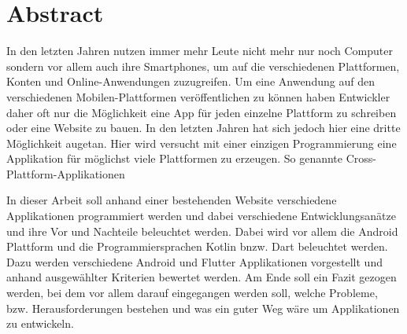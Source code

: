 \chapter*{Abstract}

\bigskip 

In den letzten Jahren nutzen immer mehr Leute nicht mehr nur noch Computer sondern vor allem auch ihre Smartphones, um auf die verschiedenen Plattformen, Konten und Online-Anwendungen zuzugreifen. Um eine Anwendung auf den verschiedenen Mobilen-Plattformen veröffentlichen zu können haben Entwickler daher oft nur die Möglichkeit eine App für jeden einzelne Plattform zu schreiben oder eine Website zu bauen. In den letzten Jahren hat sich jedoch hier eine dritte Möglichkeit augetan. Hier wird versucht mit einer einzigen Programmierung eine Applikation für möglichst viele Plattformen zu erzeugen. So genannte Cross-Plattform-Applikationen

In dieser Arbeit soll anhand einer bestehenden Website verschiedene Applikationen programmiert werden und dabei verschiedene Entwicklungsanätze und ihre Vor und Nachteile beleuchtet werden. Dabei wird vor allem die Android Plattform und die Programmiersprachen Kotlin bnzw. Dart beleuchtet werden. Dazu werden verschiedene Android und Flutter Applikationen vorgestellt und anhand ausgewählter Kriterien bewertet werden. 
Am Ende soll ein Fazit gezogen werden, bei dem vor allem darauf eingegangen werden soll, welche Probleme, bzw. Herausforderungen bestehen und was ein guter Weg wäre um Applikationen zu entwickeln.
